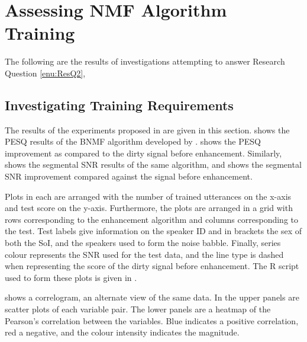 \clearpage{}


\section{Assessing \acl{NMF} Algorithm Training}

The following are the results of investigations attempting to answer
Research Question \ref{enu:ResQ2}, \textit{\RQtwo{}}


\subsection{Investigating Training Requirements}

The results of the experiments proposed in 
are given in this section.  shows the \ac{PESQ}
results of the \ac{BNMF} algorithm developed by \citet{mohammadiha2013supervised}.
 shows the \ac{PESQ} improvement as
compared to the dirty signal before enhancement. Similarly, 
shows the segmental \ac{SNR} results of the same algorithm, and 
shows the segmental \ac{SNR} improvement compared against the signal
before enhancement.

Plots in 
each are arranged with the number of trained utterances on the x-axis
and test score on the y-axis. Furthermore, the plots are arranged
in a grid with rows corresponding to the enhancement algorithm and
columns corresponding to the test. Test labels give information on
the speaker ID and in brackets the sex of both the SoI, and the speakers
used to form the noise babble. Finally, series colour represents the
\ac{SNR} used for the test data, and the line type is dashed when
representing the score of the dirty signal before enhancement. The
R script used to form these plots is given in .

 shows a correlogram, an alternate view of
the same data. In the upper panels are scatter plots of each variable
pair. The lower panels are a heatmap of the Pearson's correlation
between the variables. Blue indicates a positive correlation, red
a negative, and the colour intensity indicates the magnitude.

